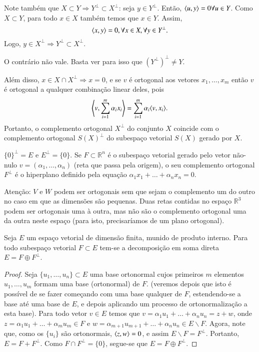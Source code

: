 Note também que $X\subset Y \Rightarrow Y^{\perp}\subset X^{\perp}$: seja $y\in Y^{\perp}$. Então, $\langle u, y \rangle=0 \forall u\in Y$. Como $X\subset Y$, para todo $x\in X$ também temos que $x\in Y$. Assim,
\begin{equation*}
  \langle x, y \rangle = 0, \forall x\in X, \forall y\in Y^{\perp}.
\end{equation*}
Logo, $y\in X^{\perp} \Rightarrow Y^{\perp} \subset X^{\perp}$.

O contrário não vale. Basta ver para isso que $(Y^{\perp})^{\perp} \ne Y$.

Além disso, $x\in X \cap X^{\perp} \Rightarrow x=0$, e se $v$ é ortogonal aos vetores $x_1,\ldots,x_m$ então $v$ é ortogonal a qualquer combinação linear deles, pois
\begin{equation*}
  \left\langle v, \sum_{i=1}^m \alpha_i x_i\right\rangle = \sum_{i=1}^m \alpha_i \langle v, x_i \rangle.
\end{equation*}
Portanto, o complemento ortogonal $X^{\perp}$ do conjunto $X$ coincide com o complemento ortogonal $S(X)^{\perp}$ do subespaço vetorial $S(X)$ gerado por $X$.

\begin{exemplo}
  $\{0\}^{\perp}=E$ e $E^{\perp}=\{0\}$. Se $F\subset {\mathbb{R}}^n$ é o subespaço vetorial gerado pelo vetor não-nulo $v=(\alpha_1,\ldots,\alpha_n)$ (reta que passa pela origem), o seu complemento ortogonal $F^{\perp}$ é o hiperplano definido pela equação $\alpha_1x_1+\ldots+\alpha_nx_n=0$.
\end{exemplo}

Atenção: $V$ e $W$ podem ser ortogonais sem que sejam o complemento um do outro no caso em que as dimensões são pequenas. Duas retas contidas no espaço ${\mathbb{R}}^3$ podem ser ortogonais uma à outra, mas não são o complemento ortogonal uma da outra neste espaço (para isto, precisaríamos de um plano ortogonal).

\begin{teo}\label{teo:provar}
  Seja $E$ um espaço vetorial de dimensão finita, munido de produto interno. Para todo subespaço vetorial $F\subset E$ tem-se a decomposição em soma direta $E=F\oplus F^{\perp}$.
\end{teo}

\begin{proof}
Seja $\{ u_1,\ldots,u_n\}\subset E$ uma base ortonormal cujos primeiros $m$ elementos $u_1,\ldots,u_m$ formam uma base (ortonormal) de $F$. (veremos depois que isto é possível de se fazer começando com uma base qualquer de $F$, estendendo-se a base até uma base de $E$, e depois aplicando um processo de ortonormalização a esta base). Para todo vetor $v\in E$ temos que $v=\alpha_1u_1+\ldots+\alpha_nu_n=z+w$, onde $z=\alpha_1u_1+\ldots+\alpha_mu_m \in F$ e $w=\alpha_{m+1}u_{m+1}+\ldots+\alpha_nu_n\in E\backslash F$. Agora, note que, como os $\{u_i\}$ são ortonormais, $\langle z, w \rangle=0$, e assim $E\backslash F = F^{\perp}$. Portanto, $E=F+F^{\perp}$. Como $F\cap F^{\perp}=\{0\}$, segue-se que $E=F\oplus F^{\perp}$.
\end{proof}

